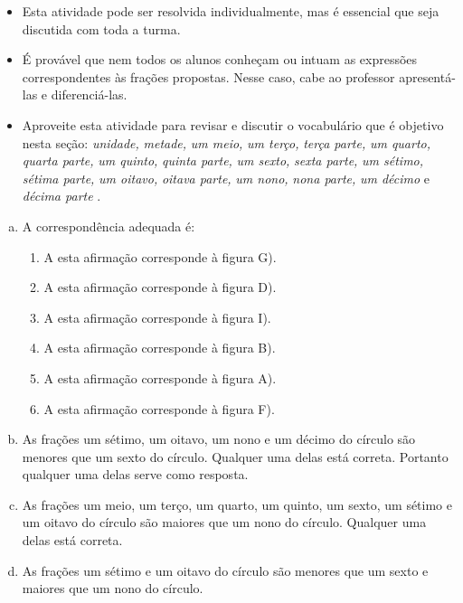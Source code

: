\begin{orientacoes}
\begin{itemize} %
    \item       Esta atividade pode ser resolvida individualmente, mas é essencial que seja discutida com toda a turma.
    \item       É provável que nem todos os alunos conheçam ou intuam as expressões correspondentes às frações propostas. Nesse caso, cabe ao professor apresentá-las e diferenciá-las.
    \item       Aproveite esta atividade para revisar e discutir o vocabulário que é objetivo nesta seção:       {\it unidade,}             {\it metade,}             {\it um meio,}             {\it um terço,}             {\it terça parte,}             {\it um quarto,}             {\it quarta parte,}             {\it um quinto,}             {\it quinta parte,}             {\it um sexto,}             {\it sexta parte,}             {\it um sétimo,}             {\it sétima parte,}             {\it um oitavo,}             {\it oitava parte,}             {\it um nono,}             {\it nona parte,}             {\it um décimo}       e       {\it décima parte}      .
\end{itemize} %
\end{orientacoes}

\begin{solucao}{}{}
\begin{enumerate}[a),wide,labelindent=0pt] %
    \item       A correspondência adequada é:
\begin{enumerate} [\;\; I), labelindent=0pt] %
        \item           A esta afirmação corresponde à figura G).
        \item           A esta afirmação corresponde à figura D).
        \item           A esta afirmação corresponde à figura I).
        \item           A esta afirmação corresponde à figura B).
        \item           A esta afirmação corresponde à figura A).
        \item           A esta afirmação corresponde à figura F).
\end{enumerate} %

    \item       As frações um sétimo, um oitavo, um nono e um décimo do círculo são menores que um sexto do círculo. Qualquer uma delas está correta. Portanto qualquer uma delas serve como resposta.
    \item       As frações um meio, um terço, um quarto, um quinto, um sexto, um sétimo e um oitavo do círculo são maiores que um nono do círculo. Qualquer uma delas está correta.
    \item       As frações um sétimo e um oitavo do círculo são menores que um sexto e maiores que um nono do círculo.
\end{enumerate} %
\end{solucao}


